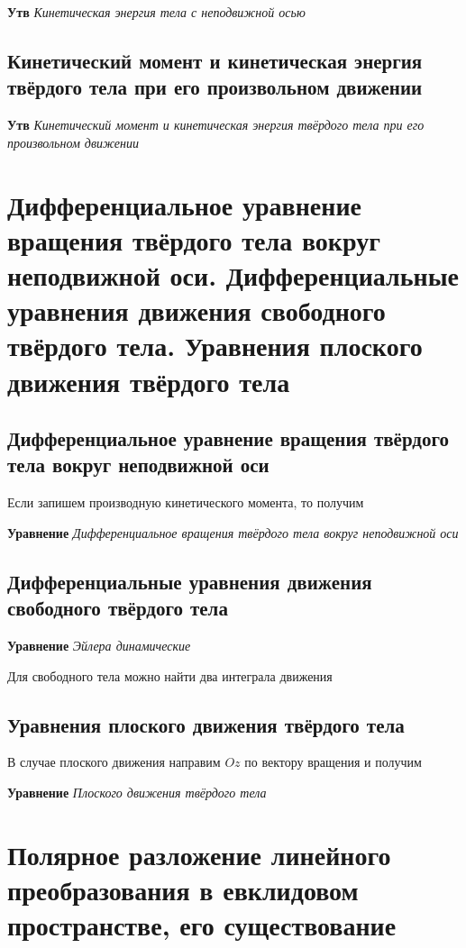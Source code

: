 \documentclass[a4paper, 14pt]{article}
\begin{document}
    \textbf{Утв} \textit{Кинетическая энергия тела с неподвижной осью}
    
    \subsection{Кинетический момент и кинетическая энергия твёрдого тела при его произвольном движении}
    
    \textbf{Утв} \textit{Кинетический момент и кинетическая энергия твёрдого тела при его произвольном движении}
    
    \section{Дифференциальное уравнение вращения твёрдого тела вокруг неподвижной оси.
    Дифференциальные уравнения движения свободного твёрдого тела.
    Уравнения плоского движения твёрдого тела}
    
    \subsection{Дифференциальное уравнение вращения твёрдого тела вокруг неподвижной оси}
    
    Если запишем производную кинетического момента, то получим
    
    \textbf{Уравнение} \textit{Дифференциальное вращения твёрдого тела вокруг неподвижной оси}
    
    \subsection{Дифференциальные уравнения движения свободного твёрдого тела}
    
    \textbf{Уравнение} \textit{Эйлера динамические}
    
    Для свободного тела можно найти два интеграла движения
    
    \subsection{Уравнения плоского движения твёрдого тела}
    
    В случае плоского движения направим $Oz$ по вектору вращения и получим
    
    \textbf{Уравнение} \textit{Плоского движения твёрдого тела}
    
    \section{Полярное разложение линейного преобразования в евклидовом пространстве, его существование}
    
\end{document}
